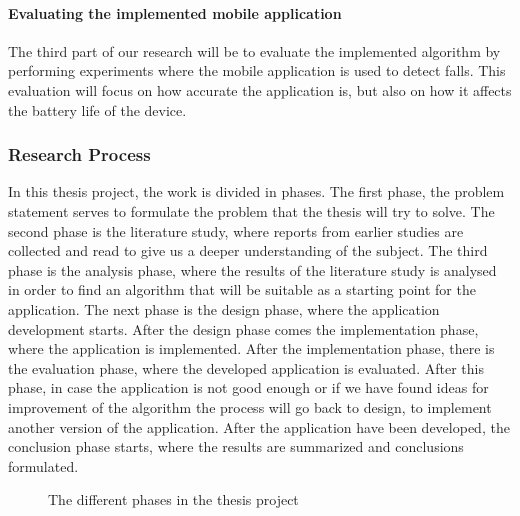 \documentclass[12pt, a4paper, onecolumn]{article}
\begin{document}
\paragraph{Evaluating the implemented mobile application}

The third part of our research will be to evaluate the implemented algorithm by performing experiments where the mobile application is used to detect falls. This evaluation will focus on how accurate the application is, but also on how it affects the battery life of the device.

\subsubsection{Research Process}

In this thesis project, the work is divided in phases. The first phase, the problem statement serves to formulate the problem that the thesis will try to solve. The second phase is the literature study, where reports from earlier studies are collected and read to give us a deeper understanding of the subject. The third phase is the analysis phase, where the results of the literature study is analysed in order to find an algorithm that will be suitable as a starting point for the application. The next phase is the design phase, where the application development starts. After the design phase comes the implementation phase, where the application is implemented. After the implementation phase, there is the evaluation phase, where the developed application is evaluated. After this phase, in case the application is not good enough or if we have found ideas for improvement of the algorithm the process will go back to design, to implement another version of the application. After the application have been developed, the conclusion phase starts, where the results are summarized and conclusions formulated. 

\begin{figure}[h]
	\centering
	\caption{The different phases in the thesis project}%
	\label{fig:example}%
\end{figure}
\end{document}
